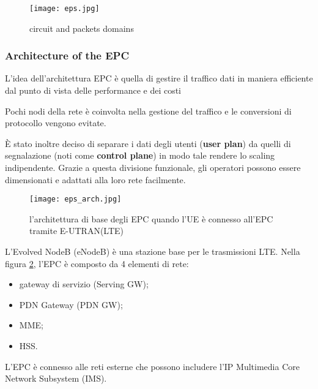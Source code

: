 \begin{figure}[H]
  \centering
  \texttt{[image: eps.jpg]}
  \caption{circuit and packets domains}
  \label{fig:eps}
\end{figure}

\subsubsection{Architecture of the EPC}

L'idea dell'architettura EPC è quella di gestire il traffico dati in maniera
 efficiente dal punto di vista delle performance e dei costi

Pochi nodi della rete è coinvolta nella gestione del traffico e le conversioni
 di protocollo vengono evitate.

È stato inoltre deciso di separare i dati degli utenti (\textbf{user plan}) da quelli di segnalazione (noti come \textbf{control plane}) in modo tale rendere
 lo scaling indipendente.
Grazie a questa divisione funzionale, gli operatori possono essere
 dimensionati e adattati alla loro rete facilmente.

\begin{figure}[H]
  \centering
  \texttt{[image: eps\_arch.jpg]}
  \caption{l'architettura di base degli EPC quando l'UE è connesso all'EPC tramite E-UTRAN(LTE)}
  \label{fig:eps_arch}
\end{figure}

L'Evolved NodeB (eNodeB) è una stazione base per le trasmissioni LTE. Nella
 figura \ref{fig:eps_arch}, l'EPC è composto da 4 elementi di rete:
\begin{itemize}
  \item gateway di servizio (Serving GW);
  \item PDN Gateway (PDN GW);
  \item MME;
  \item HSS.
\end{itemize}

L'EPC è connesso alle reti esterne che possono includere l'IP Multimedia Core 
Network Subsystem (IMS).
